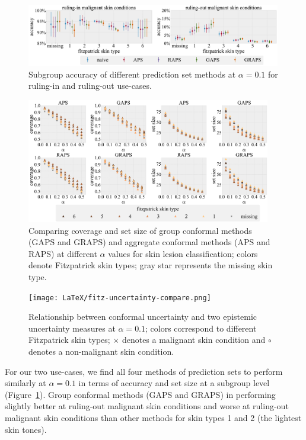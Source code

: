 \documentclass[letterpaper]{article} %
\begin{document}
    \begin{figure}[t]
    \centering
    \includegraphics[width=0.99\textwidth]{LaTeX/fitz-rule-in-out-subgroup.pdf}
    \caption{Subgroup accuracy of different prediction set methods at $\alpha=0.1$ for ruling-in and ruling-out use-cases.}
    \label{fig:fitz-use-case}
    \end{figure}

    \begin{figure}[t]
    \centering
    \includegraphics[width=0.95\textwidth]{LaTeX/fitz-subgroup-coverage.pdf}
    \caption{Comparing coverage and set size of group conformal methods (GAPS and GRAPS) and aggregate conformal methods (APS and RAPS) at different $\alpha$ values for skin lesion classification; colors denote Fitzpatrick skin types; gray star represents the missing skin type.}
    \label{fig:fitz-coverage}
    \end{figure}

    \begin{figure}[t]
    \centering
    \texttt{[image: LaTeX/fitz-uncertainty-compare.png]}
    \caption{Relationship between conformal uncertainty and two epistemic uncertainty measures at $\alpha=0.1$; colors correspond to different Fitzpatrick skin types; $\times$ denotes a malignant skin condition and $\circ$ denotes a non-malignant skin condition.}
    \label{fig:epistemic-uncertainty}
    \end{figure}

    For our two use-cases, we find all four methods of prediction sets to perform similarly at $\alpha=0.1$ in terms of accuracy and set size at a subgroup level (Figure~\ref{fig:fitz-use-case}).
    Group conformal methods (GAPS and GRAPS) in performing slightly better at ruling-out malignant skin conditions and worse at ruling-out malignant skin conditions than other methods for skin types 1 and 2 (the lightest skin tones).
\end{document}
